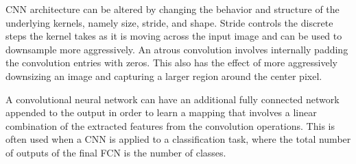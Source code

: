 CNN architecture can be altered by changing the behavior and structure of the underlying kernels, namely size, stride, and shape.
Stride controls the discrete steps the kernel takes as it is moving across the input image and can be used to downsample more aggressively.
An atrous convolution involves internally padding the convolution entries with zeros. This also has the effect of more aggressively downsizing an image and capturing a larger region around the center pixel.

A convolutional neural network can have an additional fully connected network appended to the output in order to learn a mapping that involves a linear combination of the extracted features from the convolution operations.
This is often used when a CNN is applied to a classification task, where the total number of outputs of the final FCN is the number of classes.

